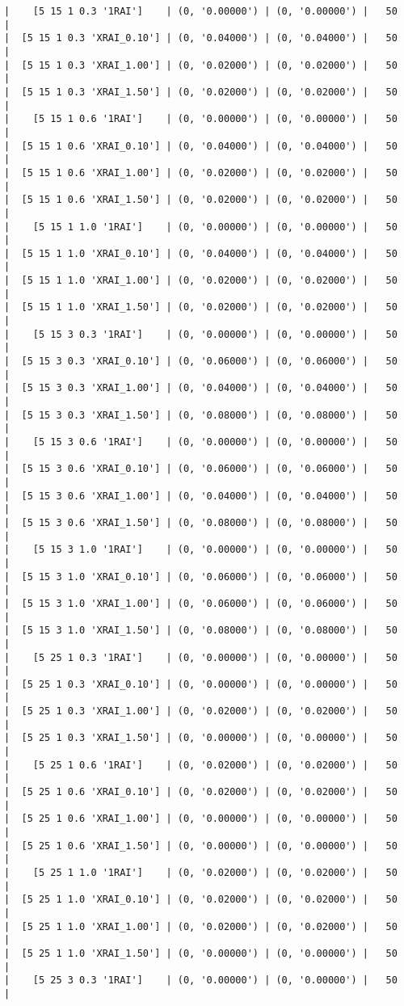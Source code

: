 \documentclass{article}
\begin{document}
\begin{verbatim}
|    [5 15 1 0.3 '1RAI']    | (0, '0.00000') | (0, '0.00000') |   50  |
|  [5 15 1 0.3 'XRAI_0.10'] | (0, '0.04000') | (0, '0.04000') |   50  |
|  [5 15 1 0.3 'XRAI_1.00'] | (0, '0.02000') | (0, '0.02000') |   50  |
|  [5 15 1 0.3 'XRAI_1.50'] | (0, '0.02000') | (0, '0.02000') |   50  |
|    [5 15 1 0.6 '1RAI']    | (0, '0.00000') | (0, '0.00000') |   50  |
|  [5 15 1 0.6 'XRAI_0.10'] | (0, '0.04000') | (0, '0.04000') |   50  |
|  [5 15 1 0.6 'XRAI_1.00'] | (0, '0.02000') | (0, '0.02000') |   50  |
|  [5 15 1 0.6 'XRAI_1.50'] | (0, '0.02000') | (0, '0.02000') |   50  |
|    [5 15 1 1.0 '1RAI']    | (0, '0.00000') | (0, '0.00000') |   50  |
|  [5 15 1 1.0 'XRAI_0.10'] | (0, '0.04000') | (0, '0.04000') |   50  |
|  [5 15 1 1.0 'XRAI_1.00'] | (0, '0.02000') | (0, '0.02000') |   50  |
|  [5 15 1 1.0 'XRAI_1.50'] | (0, '0.02000') | (0, '0.02000') |   50  |
|    [5 15 3 0.3 '1RAI']    | (0, '0.00000') | (0, '0.00000') |   50  |
|  [5 15 3 0.3 'XRAI_0.10'] | (0, '0.06000') | (0, '0.06000') |   50  |
|  [5 15 3 0.3 'XRAI_1.00'] | (0, '0.04000') | (0, '0.04000') |   50  |
|  [5 15 3 0.3 'XRAI_1.50'] | (0, '0.08000') | (0, '0.08000') |   50  |
|    [5 15 3 0.6 '1RAI']    | (0, '0.00000') | (0, '0.00000') |   50  |
|  [5 15 3 0.6 'XRAI_0.10'] | (0, '0.06000') | (0, '0.06000') |   50  |
|  [5 15 3 0.6 'XRAI_1.00'] | (0, '0.04000') | (0, '0.04000') |   50  |
|  [5 15 3 0.6 'XRAI_1.50'] | (0, '0.08000') | (0, '0.08000') |   50  |
|    [5 15 3 1.0 '1RAI']    | (0, '0.00000') | (0, '0.00000') |   50  |
|  [5 15 3 1.0 'XRAI_0.10'] | (0, '0.06000') | (0, '0.06000') |   50  |
|  [5 15 3 1.0 'XRAI_1.00'] | (0, '0.06000') | (0, '0.06000') |   50  |
|  [5 15 3 1.0 'XRAI_1.50'] | (0, '0.08000') | (0, '0.08000') |   50  |
|    [5 25 1 0.3 '1RAI']    | (0, '0.00000') | (0, '0.00000') |   50  |
|  [5 25 1 0.3 'XRAI_0.10'] | (0, '0.00000') | (0, '0.00000') |   50  |
|  [5 25 1 0.3 'XRAI_1.00'] | (0, '0.02000') | (0, '0.02000') |   50  |
|  [5 25 1 0.3 'XRAI_1.50'] | (0, '0.00000') | (0, '0.00000') |   50  |
|    [5 25 1 0.6 '1RAI']    | (0, '0.02000') | (0, '0.02000') |   50  |
|  [5 25 1 0.6 'XRAI_0.10'] | (0, '0.02000') | (0, '0.02000') |   50  |
|  [5 25 1 0.6 'XRAI_1.00'] | (0, '0.00000') | (0, '0.00000') |   50  |
|  [5 25 1 0.6 'XRAI_1.50'] | (0, '0.00000') | (0, '0.00000') |   50  |
|    [5 25 1 1.0 '1RAI']    | (0, '0.02000') | (0, '0.02000') |   50  |
|  [5 25 1 1.0 'XRAI_0.10'] | (0, '0.02000') | (0, '0.02000') |   50  |
|  [5 25 1 1.0 'XRAI_1.00'] | (0, '0.02000') | (0, '0.02000') |   50  |
|  [5 25 1 1.0 'XRAI_1.50'] | (0, '0.00000') | (0, '0.00000') |   50  |
|    [5 25 3 0.3 '1RAI']    | (0, '0.00000') | (0, '0.00000') |   50  |

\end{verbatim}
\end{document}
